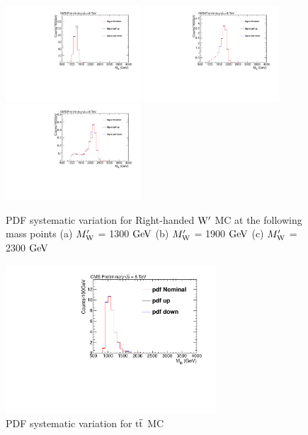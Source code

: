 \begin{figure}[htcb]
\begin{center}
\includegraphics[width=0.45\textwidth]{AN-13-004/figs/Signal_M1300_PdfScaleNNPDF23.pdf}
\includegraphics[width=0.45\textwidth]{AN-13-004/figs/Signal_M1900_PdfScaleNNPDF23.pdf}
\includegraphics[width=0.45\textwidth]{AN-13-004/figs/Signal_M2300_PdfScaleNNPDF23.pdf}
\caption{
PDF systematic variation for Right-handed $\mathrm{W}^\prime$ MC at the following mass points
(a) $M_\mathrm{W}^\prime$ = 1300$~\mathrm{GeV}$ 
(b) $M_\mathrm{W}^\prime$ = 1900$~\mathrm{GeV}$
(c) $M_\mathrm{W}^\prime$ = 2300$~\mathrm{GeV}$ 
}
\label{figs:signalPDF}
\end{center}
\end{figure}

\begin{figure}[htcb]
\begin{center}
\includegraphics[width=0.7\textwidth]{AN-13-004/figs/TTbar_PdfScaleNNPDF23.pdf}
\caption{PDF systematic variation for $\mathrm{t\overline{t}}$ MC}
\label{figs:ttbarPDF}
\end{center}
\end{figure}

